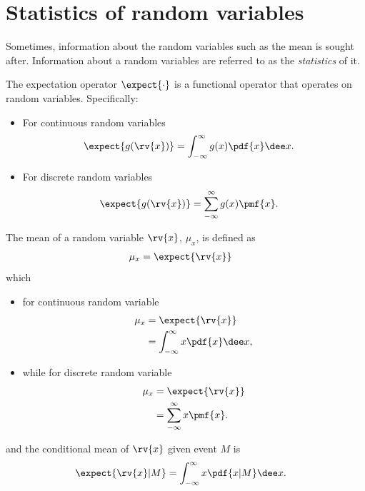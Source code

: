 \section{Statistics of random variables}
Sometimes, information about the random variables such as the mean is sought after. Information about a random variables are referred to as the \emph{statistics} of it.
\begin{mydefinition}
  \label{def: SRV expectation operator}
  The expectation operator $\expect{\cdot}$ is a functional operator that operates on random variables. Specifically:
  \begin{itemize}
      \item For continuous random variables
      \begin{align}
          \expect{g(\rv{x})}
          &= \int_{-\infty}^{\infty} g(x)\pdf{x}\dee x.
        \end{align}
        \item For discrete random variables 
        \begin{align}
            \expect{g(\rv{x})}
            &= \sum_{-\infty}^{\infty} g(x)\pmf{x}.
        \end{align}
  \end{itemize}
  
\end{mydefinition}

\begin{mydefinition}
  The mean of a random variable $\rv{x}$, $\mu_{x}$, is defined as
  \begin{align}
      \mu_{x} &= \expect{\rv{x}}      
  \end{align}
  which 
  \begin{itemize}
      \item for continuous random variable 
      \begin{align}
        \mu_{x} &= \expect{\rv{x}}\\
        &= \int_{-\infty}^{\infty}x\pdf{x}\dee x,
      \end{align}
      \item while for discrete random variable
      \begin{align}
        \mu_{x} &= \expect{\rv{x}}\\
        &= \sum_{-\infty}^{\infty}x\pmf{x}.
      \end{align}
  \end{itemize}
  and the conditional mean of $\rv{x}$ given event $M$ is
  \begin{align}
      \expect{\rv{x}|M} &= \int_{-\infty}^{\infty} x\pdf{x|M}\dee x.
  \end{align}
\end{mydefinition}

